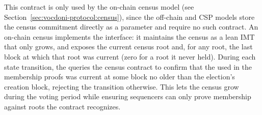 This contract is only used by the on-chain census model (see Section~\ref{sec:vocdoni-protocol:census}), since the off-chain and \ac{CSP} models store the census commitment directly as a parameter and require no such contract. An on-chain census implements the \hlset{\censusvalidator} interface: it maintains the census as a lean \ac{IMT} that only grows, and exposes the current census root and, for any root, the last block at which that root was current (zero for a root it never held). During each state transition, the \processregistry queries the census contract to confirm that the \censusroot used in the membership proofs was current at some block no older than the election's creation block, rejecting the transition otherwise. This lets the census grow during the voting period while ensuring sequencers can only prove membership against roots the contract recognizes.
